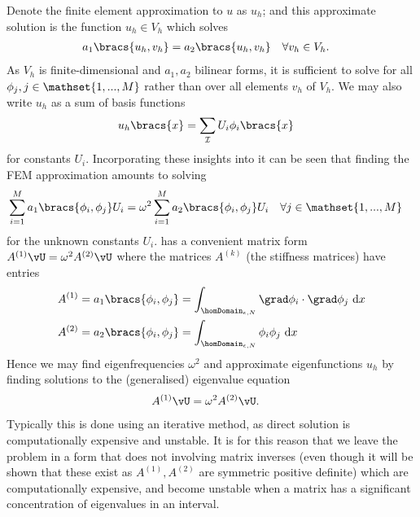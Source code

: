 Denote the finite element approximation to $u$ as $u_{h}$; and this approximate solution is the function $u_{h}\in V_{h}$ which solves
\begin{align} \label{eq:FEMWeakApprox}
	a_{1}\bracs{u_{h},v_{h}} = a_{2}\bracs{u_{h},v_{h}} &\quad \forall v_{h}\in V_{h}.
\end{align}
As $V_{h}$ is finite-dimensional and $a_{1}, a_{2}$ bilinear forms, it is sufficient to solve  for all $\phi_{j}, j\in\mathset{1,...,M}$ rather than over all elements $v_{h}$ of $V_{h}$. 
We may also write $u_{h}$ as a sum of basis functions
\begin{align*}
	u_{h}\bracs{x} &= \sum_{\mathcal{I}}U_{i}\phi_{i}\bracs{x}
\end{align*}
for constants $U_{i}$.
Incorporating these insights into  it can be seen that finding the FEM approximation amounts to solving
\begin{align} \label{eq:FEMWeakFinite}
	\sum_{i=1}^{M}a_{1}\bracs{\phi_{i},\phi_{j}}U_{i} &= \omega^{2}\sum_{i=1}^{M}a_{2}\bracs{\phi_{i},\phi_{j}}U_{i} \quad \forall j\in\mathset{1,...,M}
\end{align}
for the unknown constants $U_{i}$.
 has a convenient matrix form $A^{(1)}\vU = \omega^{2}A^{(2)}\vU$ where the matrices $A^{(k)}$ (the stiffness matrices) have entries 
\begin{align*}
	A^{(1)} &= a_{1}\bracs{\phi_{i},\phi_{j}} = \int_{\homDomain_{\epsilon, N}}\grad\phi_{i}\cdot\grad\phi_{j} \ \mathrm{d}x \\
	A^{(2)} &= a_{2}\bracs{\phi_{i},\phi_{j}} = \int_{\homDomain_{\epsilon, N}}\phi_{i}\phi_{j} \ \mathrm{d}x
\end{align*}
Hence we may find eigenfrequencies $\omega^{2}$ and approximate eigenfunctions $u_{h}$ by finding solutions to the (generalised) eigenvalue equation
\begin{align} \label{eq:EvalEqn}
	A^{(1)}\vU &= \omega^{2}A^{(2)}\vU.
\end{align} 
Typically this is done using an iterative method, as direct solution is computationally expensive and unstable.
It is for this reason that we leave the problem in a form that does not involving matrix inverses (even though it will be shown that these exist as $A^{(1)},A^{(2)}$ are symmetric positive definite) which are computationally expensive, and become unstable when a matrix has a significant concentration of eigenvalues in an interval. \newline

